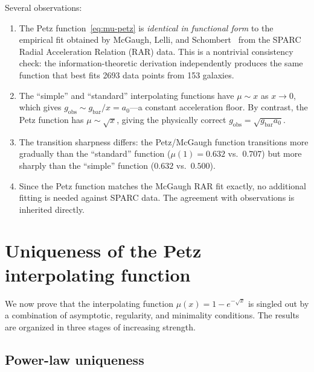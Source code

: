 \documentclass[prd,twocolumn,superscriptaddress,longbibliography,floatfix]{revtex4-2}
\begin{document}
Several observations:
\begin{enumerate}
  \item The Petz function~\eqref{eq:mu-petz} is
    \emph{identical in functional form} to the empirical fit
    obtained by McGaugh, Lelli, and Schombert~\cite{McGaugh2016}
    from the SPARC Radial Acceleration Relation (RAR) data.
    This is a nontrivial consistency check: the
    information-theoretic derivation independently produces the
    same function that best fits 2693 data points from 153
    galaxies.

  \item The ``simple'' and ``standard'' interpolating functions
    have $\mu \sim x$ as $x \to 0$, which gives
    $g_{\mathrm{obs}} \sim g_{\mathrm{bar}}/x
    = a_0$---a constant acceleration floor. By contrast, the
    Petz function has $\mu \sim \sqrt{x}$, giving the physically
    correct $g_{\mathrm{obs}} = \sqrt{g_{\mathrm{bar}} a_0}$.

  \item The transition sharpness differs: the Petz/McGaugh
    function transitions more gradually than the ``standard''
    function ($\mu(1) = 0.632$ vs.\ $0.707$) but more sharply
    than the ``simple'' function ($0.632$ vs.\ $0.500$).

  \item Since the Petz function matches the McGaugh RAR fit
    exactly, no additional fitting is needed against SPARC data.
    The agreement with observations is inherited directly.
\end{enumerate}

\section{Uniqueness of the Petz interpolating function}
\label{sec:uniqueness}

We now prove that the interpolating function
$\mu(x) = 1 - e^{-\sqrt{x}}$ is singled out by a combination of
asymptotic, regularity, and minimality conditions.  The results are
organized in three stages of increasing strength.

\subsection{Power-law uniqueness}
\label{sec:powerlaw}
\end{document}

